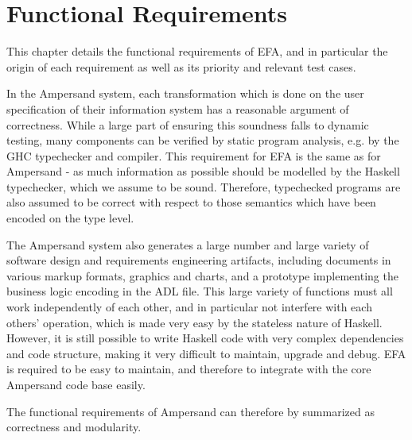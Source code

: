 \chapter{Functional Requirements}\label{sec:Functional}

This chapter details the functional requirements of EFA, and in particular the
origin of each requirement as well as its priority and relevant test cases.

In the Ampersand system, each transformation which is done on the user
specification of their information system has a reasonable argument of
correctness. While a large part of ensuring this soundness falls to dynamic
testing, many components can be verified by static program analysis, e.g. by the
GHC typechecker and compiler. This requirement for EFA is the same as for
Ampersand - as much information as possible should be modelled by the Haskell
typechecker, which we assume to be sound. Therefore, typechecked programs are
also assumed to be correct with respect to those semantics which have been
encoded on the type level.
 
The Ampersand system also generates a large number and large variety of 
software design and requirements engineering artifacts, including 
documents in various markup formats, graphics and charts, and 
a prototype implementing the business logic encoding in the ADL file.
This large variety of functions must all work independently of 
each other, and in particular not interfere with each others' operation,
which is made very easy by the stateless nature of Haskell. However,
it is still possible to write Haskell code with very complex 
dependencies and code structure, making it very difficult to maintain,
upgrade and debug. EFA is required to be easy to maintain, and therefore
to integrate with the core Ampersand code base easily. 

 The functional requirements of Ampersand can therefore by summarized 
as correctness and modularity. 

